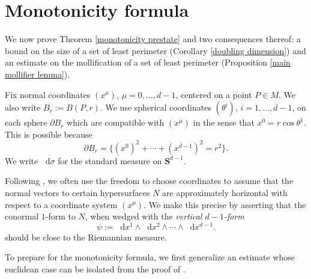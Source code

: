 \documentclass[reqno,10pt]{amsart}
\newcommand{\Sph}{\mathbf S}
\newcommand*\dif{\mathop{}\!\mathrm{d}}
\newcommand{\dfn}[1]{\emph{#1}\index{#1}}
\theoremstyle{definition}
\numberwithin{equation}{section}
\begin{document}
\section{Monotonicity formula}\label{MollifierSection}
We now prove Theorem \ref{monotonicity prestate} and two consequences thereof: a bound on the size of a set of least perimeter (Corollary \ref{doubling dimension}) and an estimate on the mollification of a set of least perimeter (Proposition \ref{main mollifier lemma}).

Fix normal coordinates $(x^\mu)$, $\mu = 0, \dots, d - 1$, centered on a point $P \in M$.
We also write $B_r := B(P, r)$.
We use spherical coordinates $(\theta^i)$, $i = 1, \dots, d - 1$, on each sphere $\partial B_r$ which are compatible with $(x^\mu)$ in the sense that $x^0 = r \cos \theta^1$.
This is possible because
\begin{equation}\label{partial Br is a variety}
\partial B_r = \{(x^0)^2 + \cdots + (x^{d - 1})^2 = r^2\}.
\end{equation}
We write $\dif \sigma$ for the standard measure on $\Sph^{d - 1}$.

Following \cite{Giusti77}, we often use the freedom to choose coordinates to assume that the normal vectors to certain hypersurfaces $N$ are approximately horizontal with respect to a coordinate system $(x^\mu)$.
We make this precise by asserting that the conormal $1$-form to $N$, when wedged with the \dfn{vertical $d-1$-form}
\begin{equation}\label{d1 form}
\psi := \dif x^1 \wedge \dif x^2 \wedge \cdots \wedge \dif x^{d - 1}.
\end{equation}
should be close to the Riemannian measure.

To prepare for the monotonicity formula, we first generalize an estimate whose euclidean case can be isolated from the proof of \cite[Lemma 5.8]{Giusti77}.
\end{document}
